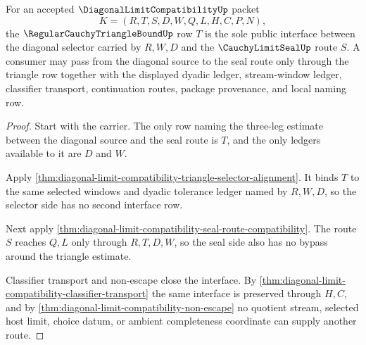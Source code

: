 \begin{theorem}
\label{thm:diagonallimitcompatibility-triangle-seal-interface}
For an accepted $\DiagonalLimitCompatibilityUp$ packet
$$
K=(R,T,S,D,W,Q,L,H,C,P,N),
$$
the $\RegularCauchyTriangleBoundUp$ row $T$ is the sole public interface between the diagonal selector carried by $R,W,D$ and the $\CauchyLimitSealUp$ route $S$. A consumer may pass from the diagonal source to the seal route only through the triangle row together with the displayed dyadic ledger, stream-window ledger, classifier transport, continuation routes, package provenance, and local naming row.
\end{theorem}
\begin{proof}
Start with the carrier. The only row naming the three-leg estimate between the diagonal source and the seal route is $T$, and the only ledgers available to it are $D$ and $W$.

Apply \autoref{thm:diagonal-limit-compatibility-triangle-selector-alignment}. It binds $T$ to the same selected windows and dyadic tolerance ledger named by $R,W,D$, so the selector side has no second interface row.

Next apply \autoref{thm:diagonal-limit-compatibility-seal-route-compatibility}. The route $S$ reaches $Q,L$ only through $R,T,D,W$, so the seal side also has no bypass around the triangle estimate.

Classifier transport and non-escape close the interface. By \autoref{thm:diagonal-limit-compatibility-classifier-transport} the same interface is preserved through $H,C$, and by \autoref{thm:diagonal-limit-compatibility-non-escape} no quotient stream, selected host limit, choice datum, or ambient completeness coordinate can supply another route.
\end{proof}

